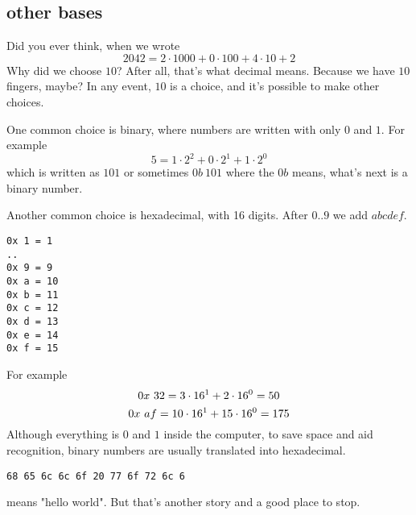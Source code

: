 \documentclass[11pt, oneside]{article}
\begin{document}
\subsection*{other bases}
Did you ever think, when we wrote
\[ 2042 = 2 \cdot 1000 + 0 \cdot 100 + 4 \cdot 10 + 2 \]
Why did we choose $10$?  After all, that's what decimal means.  Because we have $10$ fingers, maybe?  In any event, $10$ is a choice, and it's possible to make other choices.

One common choice is binary, where numbers are written with only $0$ and $1$.  For example
\[ 5 = 1 \cdot 2^2 + 0 \cdot 2^1 + 1 \cdot 2^0 \]
which is written as $101$ or sometimes $0b \ 101$ where the $0b$ means, what's next is a binary number.

Another common choice is hexadecimal, with 16 digits.  After $0..9$ we add $abcdef$.  

\begin{verbatim}
0x 1 = 1 
..
0x 9 = 9
0x a = 10
0x b = 11
0x c = 12
0x d = 13
0x e = 14
0x f = 15
\end{verbatim}

For example
\[ \\0x \ 32 = 3 \cdot 16^1 + 2 \cdot 16^0 = 50 \]
\[ \\0x \ af = 10 \cdot 16^1 + 15 \cdot 16^0 = 175 \]
Although everything is $0$ and $1$ inside the computer, to save space and aid recognition, binary numbers are usually translated into hexadecimal.  

\begin{verbatim}
68 65 6c 6c 6f 20 77 6f 72 6c 6
\end{verbatim}
means "hello world".  But that's another story and a good place to stop.
\end{document}
